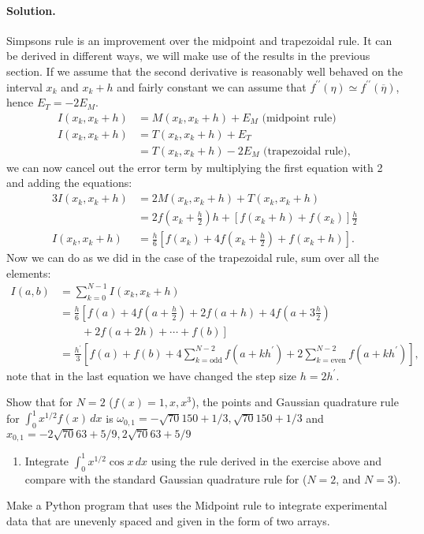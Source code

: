 \documentclass[graybox,sectrefs,envcountresetchap,open=right,final]{svmonodo}
\newenvironment{doconceexercise}{}{}
\begin{document}
\begin{doconceexercise}
\paragraph{Solution.}
Simpsons rule is an improvement over the midpoint and trapezoidal rule. It can be derived in different ways, we will make use of 
the results in the previous section. If we assume that the second derivative is reasonably well behaved on the interval $x_k$ 
and $x_k+h$ and fairly constant we can assume that $f^{\prime\prime}(\eta)\simeq f^{\prime\prime}(\overline{\eta})$, hence $E_T=-2E_M$.
\begin{align}
I(x_k,x_k+h)&=M(x_k,x_k+h)+E_M\text{ (midpoint rule)}\\ 
I(x_k,x_k+h)&=T(x_k,x_k+h)+E_T\nonumber\\ 
&=T(x_k,x_k+h)-2E_M\text{ (trapezoidal rule)},
\end{align}
we can now cancel out the error term by multiplying the first equation with 2 and adding the equations:
\begin{align}
3I(x_k,x_k+h)&=2M(x_k,x_k+h)+T(x_k,x_k+h)\\ 
&=2f(x_k+\frac{h}{2}) h+\left[f(x_k+h)+f(x_k)\right] \frac{h}{2}\\ 
I(x_k,x_k+h)&=\frac{h}{6}\left[f(x_k)+4f(x_k+\frac{h}{2})+f(x_k+h)\right].
\end{align}
Now we can do as we did in the case of the trapezoidal rule, sum over all the elements:
\begin{align}
I(a,b)&=\sum_{k=0}^{N-1}I(x_k,x_k+h)\nonumber\\ 
&=\frac{h}{6}\left[f(a)+ 4f(a+\frac{h}{2})+2f(a+h)+4f(a+3\frac{h}{2})\right.\nonumber\\ 
&\left.\qquad+2f(a+2h)+\cdots+f(b)\right]\\ 
&=\frac{h^\prime}{3}\left[f(a)+ f(b) + 4\sum_{k= \text{odd}}^{N-2}f(a+k h^\prime)+2\sum_{k= \text{even}}^{N-2}f(a+k h^\prime)\right],
\end{align}
note that in the last equation we have changed the step size $h=2h^\prime$.


Show that for $N=2$ ($f(x)=1,x,x^3$), the points and Gaussian quadrature rule for $\int_{0}^{1}x^{1/2}f(x)\,dx$
is $\omega_{0,1}=-\sqrt{70}{150} + 1/3, \sqrt{70}{150} + 1/3$
and $x_{0,1}=-2\sqrt{70}{63} + 5/9, 2\sqrt{70}{63} + 5/9$
\begin{enumerate}
\item Integrate $\int_0^1x^{1/2}\cos x\,dx$ using the rule derived in the exercise above and compare with the standard Gaussian quadrature rule for ($N=2$, and $N=3$).
\end{enumerate}

\noindent
{}
Make a Python program that uses the Midpoint rule to integrate experimental data that are unevenly spaced and given in the form of two arrays.




\end{doconceexercise}
\end{document}
